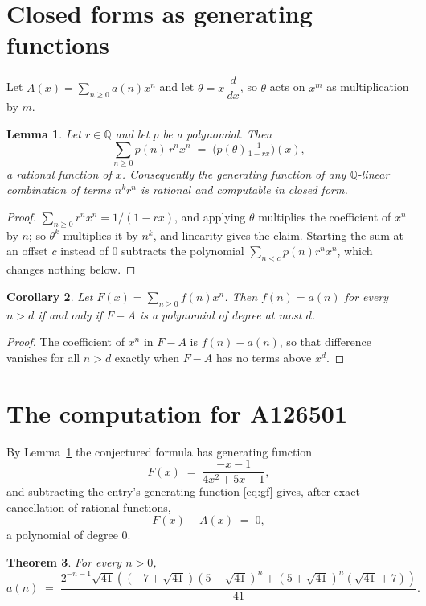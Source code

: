 \documentclass[11pt,a4paper]{article}
\theoremstyle{plain}
\newtheorem{theorem}{Theorem}
\newtheorem{lemma}[theorem]{Lemma}
\newtheorem{corollary}[theorem]{Corollary}
\theoremstyle{definition}
\begin{document}
\section{Closed forms as generating functions}

Let $A(x)=\sum_{n\ge 0}a(n)x^{n}$ and let $\theta=x\,\dfrac{d}{dx}$, so $\theta$
acts on $x^{m}$ as multiplication by $m$.

\begin{lemma}\label{lem:gf}
Let $r\in\mathbb{Q}$ and let $p$ be a polynomial. Then
\[
\sum_{n\ge0}p(n)\,r^{n}x^{n}\;=\;\bigl(p(\theta)\tfrac{1}{1-rx}\bigr)(x),
\]
a rational function of $x$. Consequently the generating function of any
$\mathbb{Q}$-linear combination of terms $n^{k}r^{n}$ is rational and computable in
closed form.
\end{lemma}

\begin{proof}
$\sum_{n\ge0}r^{n}x^{n}=1/(1-rx)$, and applying $\theta$ multiplies the coefficient of
$x^{n}$ by $n$; so $\theta^{k}$ multiplies it by $n^{k}$, and linearity gives the claim.
Starting the sum at an offset $c$ instead of $0$ subtracts the polynomial
$\sum_{n<c}p(n)r^{n}x^{n}$, which changes nothing below.
\end{proof}

\begin{corollary}\label{cor:criterion}
Let $F(x)=\sum_{n\ge 0}f(n)x^{n}$. Then $f(n)=a(n)$ for every $n>d$ if and only
if $F-A$ is a polynomial of degree at most $d$.
\end{corollary}

\begin{proof}
The coefficient of $x^{n}$ in $F-A$ is $f(n)-a(n)$, so that difference vanishes for all
$n>d$ exactly when $F-A$ has no terms above $x^{d}$.
\end{proof}

\section{The computation for A126501}

By Lemma~\ref{lem:gf} the conjectured formula has generating function
\[
F(x)\;=\;\frac{- x - 1}{4 x^{2} + 5 x - 1} ,
\]
and subtracting the entry's generating function \eqref{eq:gf} gives, after exact
cancellation of rational functions,
\[
F(x)-A(x)\;=\;0 ,
\]
a polynomial of degree $0$.

\begin{theorem}
For every $n>0$,
\[
a(n)\;=\;\frac{2^{- n - 1} \sqrt{41} \left(\left(-7 + \sqrt{41}\right) \left(5 - \sqrt{41}\right)^{n} + \left(5 + \sqrt{41}\right)^{n} \left(\sqrt{41} + 7\right)\right)}{41} .
\]
\end{theorem}
\end{document}
